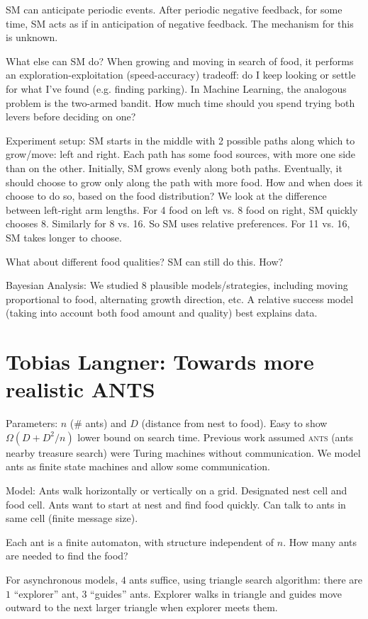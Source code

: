 \documentclass{article}
\newcommand{\acro}[1]{\textsc{\MakeLowercase{#1}}}
\begin{document}
SM can anticipate periodic events. After periodic negative feedback, for some
time, SM acts as if in anticipation of negative feedback. The mechanism for
this is unknown.

What else can SM do? When growing and moving in search of food, it performs an
exploration-exploitation (speed-accuracy) tradeoff: do I keep looking or settle
for what I've found (e.g. finding parking). In Machine Learning, the analogous
problem is the two-armed bandit. How much time should you spend trying both
levers before deciding on one?

Experiment setup: SM starts in the middle with 2 possible paths along which to
grow/move: left and right. Each path has some food sources, with more one side
than on the other. Initially, SM grows evenly along both paths. Eventually, it
should choose to grow only along the path with more food. How and when does it
choose to do so, based on the food distribution? We look at the difference
between left-right arm lengths. For 4 food on left vs. 8 food on right, SM
quickly chooses 8. Similarly for 8 vs. 16. So SM uses relative preferences.
For 11 vs. 16, SM takes longer to choose.

What about different food qualities? SM can still do this. How?

Bayesian Analysis: We studied 8 plausible models/strategies, including moving
proportional to food, alternating growth direction, etc. A relative success
model (taking into account both food amount and quality) best explains data.

\section{Tobias Langner: Towards more realistic ANTS}

Parameters: $n$ (\# ants) and $D$ (distance from nest to food). Easy to show
$\Omega(D + D^2/n)$ lower bound on search time. Previous work assumed
\acro{ANTS} (ants nearby treasure search) were Turing machines without
communication. We model ants as finite state machines and allow some
communication.

Model: Ants walk horizontally or vertically on a grid. Designated nest cell and
food cell. Ants want to start at nest and find food quickly. Can talk to ants
in same cell (finite message size).

Each ant is a finite automaton, with structure independent of $n$. How many
ants are needed to find the food?

For asynchronous models, $4$ ants suffice, using triangle search
algorithm: there are $1$ ``explorer'' ant, $3$ ``guides'' ants. Explorer walks
in triangle and guides move outward to the next larger triangle when explorer
meets them.
\end{document}
